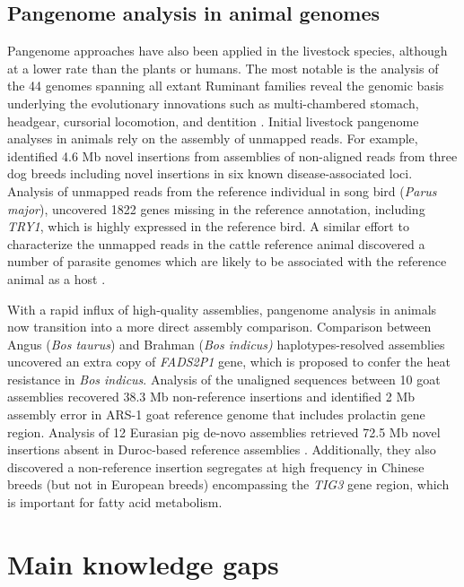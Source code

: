\documentclass[../main.tex]{subfiles}
\begin{document}
\subsection*{Pangenome analysis in animal genomes}
Pangenome approaches have also been applied in the livestock species, although at a lower rate than the plants or humans. The most notable is the analysis of the 44 genomes spanning all extant Ruminant families reveal the genomic basis underlying the evolutionary innovations such as multi-chambered stomach, headgear, cursorial locomotion, and dentition \citep{chen2019large}. Initial livestock pangenome analyses in animals rely on the assembly of unmapped reads. For example, \citet{holden2018assembly} identified 4.6 Mb novel insertions from assemblies of non-aligned reads from three dog breeds including  novel insertions in six known disease-associated loci. Analysis of unmapped reads from the reference individual in song bird (\emph{Parus major}), \citet{laine2019exploring} uncovered 1822 genes missing in the reference annotation, including \emph{TRY1}, which is highly expressed in the reference bird. A similar effort to characterize the unmapped reads in the cattle reference animal discovered a number of parasite genomes which are likely to be associated with the reference animal as a host \citep{whitacre2015s}. 

With a rapid influx of high-quality assemblies, pangenome analysis in animals now transition into a more direct assembly comparison. Comparison between Angus (\emph{Bos taurus}) and Brahman (\emph{Bos indicus)} haplotypes-resolved assemblies \citep{Low2020} uncovered an extra copy of \emph{FADS2P1} gene, which is proposed to confer the heat resistance in \emph{Bos indicus}. Analysis of the unaligned sequences between 10 goat assemblies \citep{li2019towards} recovered 38.3 Mb non-reference insertions and identified 2 Mb assembly error in ARS-1 goat reference genome that includes prolactin gene region. Analysis of 12 Eurasian pig de-novo assemblies retrieved 72.5 Mb novel insertions absent in Duroc-based reference assemblies \citep{li2017comprehensive,tian2019building}. Additionally, they also discovered a non-reference insertion segregates at high frequency in Chinese breeds (but not in European breeds) encompassing the \emph{TIG3} gene region, which is important for fatty acid metabolism. 


\section{Main knowledge gaps}
\end{document}
